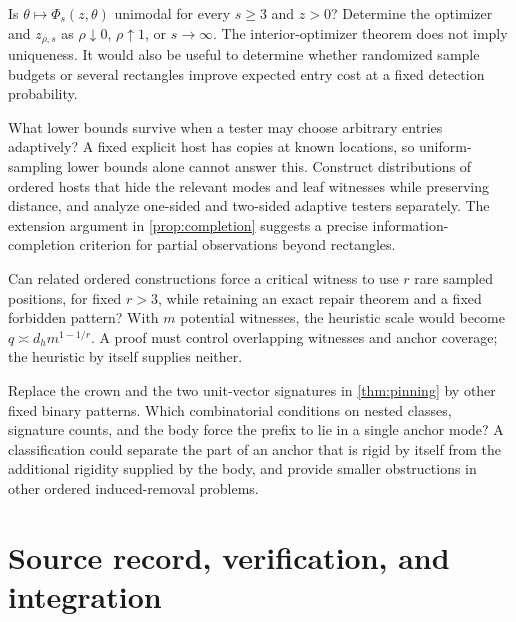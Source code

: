 \begin{question}
Is \(\theta\mapsto\Phi_s(z,\theta)\) unimodal for every \(s\ge3\)
and \(z>0\)? Determine the optimizer and \(z_{\rho,s}\) as
\(\rho\downarrow0\), \(\rho\uparrow1\), or \(s\to\infty\).
The interior-optimizer theorem does not imply uniqueness. It would
also be useful to determine whether randomized sample budgets or
several rectangles improve expected entry cost at a fixed detection
probability.
\end{question}

\begin{question}
What lower bounds survive when a tester may choose arbitrary entries
adaptively? A fixed explicit host has copies at known locations, so
uniform-sampling lower bounds alone cannot answer this. Construct
distributions of ordered hosts that hide the relevant modes and leaf
witnesses while preserving distance, and analyze one-sided and
two-sided adaptive testers separately. The extension argument in
\cref{prop:completion} suggests a precise information-completion
criterion for partial observations beyond rectangles.
\end{question}

\begin{question}
Can related ordered constructions force a critical witness to use
\(r\) rare sampled positions, for fixed \(r>3\), while retaining
an exact repair theorem and a fixed forbidden pattern? With \(m\)
potential witnesses, the heuristic scale would become
\(q\asymp d_hm^{1-1/r}\). A proof must control overlapping witnesses
and anchor coverage; the heuristic by itself supplies neither.
\end{question}

\begin{question}
Replace the crown and the two unit-vector signatures in
\cref{thm:pinning} by other fixed binary patterns. Which combinatorial
conditions on nested classes, signature counts, and the body force
the prefix to lie in a single anchor mode? A classification could
separate the part of an anchor that is rigid by itself from the
additional rigidity supplied by the body, and provide smaller
obstructions in other ordered induced-removal problems.
\end{question}

\section{Source record, verification, and integration}
\label{sec:verification}

